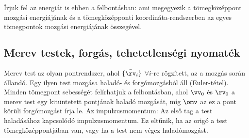    Írjuk fel az energiát is ebben a felbontásban:
   ami megegyezik a tömegközéppont mozgási energiájának és a tömegközépponti koordináta-rendszerben az egyes tömegpontok mozgási energiájának összegével. 
   
   \subsection{Merev testek, forgás, tehetetlenségi nyomaték}
   
   Merev test az olyan pontrendszer, ahol $\{\bar\rv_i\}$ $\forall i$-re rögzített, az a mozgás során állandó.
   Egy ilyen test mozgása haladó- és forgómozgásból áll (Euler-tétel).
   Minden tömegpont sebességét felírhatjuk a 
   felbontásban, ahol $\vv_0$ és $\rv_0$ a merev test egy kitüntetett pontjának haladó mozgását, míg $\omv$ az ez a pont körüli forgómozgást írja le.
   Az impulzusmomentum:
   Az első tag a test haladásához kapcsolódó impulzusmomentum.
   Ez eltűnik, ha az origó a test tömegközéppontjában van, vagy ha a test nem végez haladómozgást. 
   
